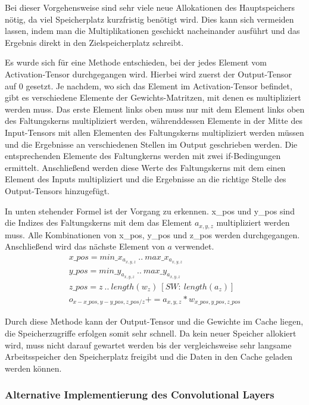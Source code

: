 \documentclass[../main.tex]{subfiles}
\begin{document}
Bei dieser Vorgehensweise sind sehr viele neue Allokationen des Hauptspeichers nötig, da viel Speicherplatz kurzfristig benötigt wird. Dies kann sich vermeiden lassen, indem man die Multiplikationen geschickt nacheinander ausführt und das Ergebnis direkt in den Zielspeicherplatz schreibt. 

Es wurde sich für eine Methode entschieden, bei der jedes Element vom Activation-Tensor durchgegangen wird. Hierbei wird zuerst der Output-Tensor auf 0 gesetzt. Je nachdem, wo sich das Element im Activation-Tensor befindet, gibt es verschiedene Elemente der Gewichts-Matritzen, mit denen es multipliziert werden muss. Das erste Element links oben muss nur mit dem Element links oben des Faltungskerns multipliziert werden, währenddessen Elemente in der Mitte des Input-Tensors mit allen Elementen des Faltungskerns multipliziert werden müssen und die Ergebnisse an verschiedenen Stellen im Output geschrieben werden. Die entsprechenden Elemente des Faltungkerns werden mit zwei if-Bedingungen ermittelt. Anschließend werden diese Werte des Faltungskerns mit dem einen Element des Inputs multipliziert und die Ergebnisse an die richtige Stelle des Output-Tensors hinzugefügt.

In unten stehender Formel ist der Vorgang zu erkennen. x\_pos und y\_pos sind die Indizes des Faltungskerns mit dem das Element \(a_{x,y,z}\) multipliziert werden muss. Alle Kombinationen von x\_pos, y\_pos und z\_pos werden durchgegangen. Anschließend wird das nächste Element von \(a\) verwendet.
\begin{equation}
\begin{split}
x\_pos = {min\_x_{a_{x,y,z}}\ ..\ max\_x_{a_{x,y,z}}}\\
y\_pos = {min\_y_{a_{x,y,z}}\ ..\ max\_y_{a_{x,y,z}}}\\
z\_pos = {z\ ..\ length(w_{z})\ [SW:\ length(a_{z})]}\\
o_{x-x\_pos,y-y\_pos,z\_pos/z} += a_{x,y,z}*w_{x\_pos,y\_pos,z\_pos}
\end{split}
\end{equation}

Durch diese Methode kann der Output-Tensor und die Gewichte im Cache liegen, die Speicherzugriffe erfolgen somit sehr schnell. Da kein neuer Speicher allokiert wird, muss nicht darauf gewartet werden bis der vergleichsweise sehr langsame Arbeitsspeicher den Speicherplatz freigibt und die Daten in den Cache geladen werden können. 

\subsubsection{Alternative Implementierung des Convolutional Layers}
\end{document}
